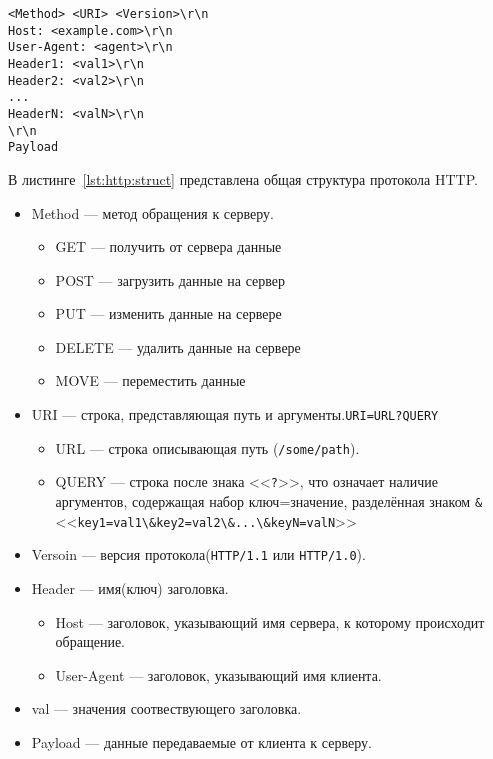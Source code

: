 \begin{lstlisting}[caption={Общая структура HTTP протокола}, label={lst:http:struct}]
<Method> <URI> <Version>\r\n
Host: <example.com>\r\n
User-Agent: <agent>\r\n
Header1: <val1>\r\n
Header2: <val2>\r\n
...
HeaderN: <valN>\r\n
\r\n
Payload
\end{lstlisting}

В листинге~\ref{lst:http:struct} представлена общая структура протокола HTTP.
\begin{itemize}
    \item Method --- метод обращения к серверу.
    \begin{itemize}
        \item GET --- получить от сервера данные
        \item POST --- загрузить данные на сервер
        \item PUT --- изменить данные на сервере
        \item DELETE --- удалить данные на сервере
        \item MOVE --- переместить данные
    \end{itemize}
    \item URI --- строка, представляющая путь и аргументы.{\tt URI=URL?QUERY}
    \begin{itemize}
        \item URL --- строка описывающая путь (\texttt{/some/path}).
        \item QUERY --- строка после знака <<\verb!?!>>, что означает наличие аргументов,
            содержащая набор ключ=значение, разделённая знаком \texttt{\&} \\
            <<\verb!key1=val1\&key2=val2\&...\&keyN=valN!>>
    \end{itemize}
    \item Versoin --- версия протокола(\texttt{HTTP/1.1} или \texttt{HTTP/1.0}).
    \item Header --- имя(ключ) заголовка.
    \begin{itemize}
        \item Host --- заголовок, указывающий имя сервера, к которому происходит обращение.
        \item User-Agent --- заголовок, указывающий имя клиента.
    \end{itemize}
    \item val --- значения соотвествующего заголовка.
    \item Payload --- данные передаваемые от клиента к серверу.
\end{itemize}

